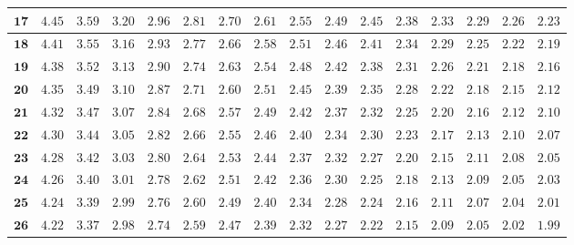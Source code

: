\begin{customTableWrapper}{1.4}
\begin{longtable}{|r|r|r|r|r|r|r|r|r|r|r|r|r|r|r|r|}
    ${\mathbf{17}}$  & ${4.45}$   & ${3.59}$   & ${3.20}$   & ${2.96}$   & ${2.81}$   & ${2.70}$   & ${2.61}$   & ${2.55}$   & ${2.49}$   & ${2.45}$   & ${2.38}$   & ${2.33}$   & ${2.29}$   & ${2.26}$   & ${2.23}$   \\ \hline
    ${\mathbf{18}}$  & ${4.41}$   & ${3.55}$   & ${3.16}$   & ${2.93}$   & ${2.77}$   & ${2.66}$   & ${2.58}$   & ${2.51}$   & ${2.46}$   & ${2.41}$   & ${2.34}$   & ${2.29}$   & ${2.25}$   & ${2.22}$   & ${2.19}$   \\ \hline
    ${\mathbf{19}}$  & ${4.38}$   & ${3.52}$   & ${3.13}$   & ${2.90}$   & ${2.74}$   & ${2.63}$   & ${2.54}$   & ${2.48}$   & ${2.42}$   & ${2.38}$   & ${2.31}$   & ${2.26}$   & ${2.21}$   & ${2.18}$   & ${2.16}$   \\ \hline
    ${\mathbf{20}}$  & ${4.35}$   & ${3.49}$   & ${3.10}$   & ${2.87}$   & ${2.71}$   & ${2.60}$   & ${2.51}$   & ${2.45}$   & ${2.39}$   & ${2.35}$   & ${2.28}$   & ${2.22}$   & ${2.18}$   & ${2.15}$   & ${2.12}$   \\ \hline
    ${\mathbf{21}}$  & ${4.32}$   & ${3.47}$   & ${3.07}$   & ${2.84}$   & ${2.68}$   & ${2.57}$   & ${2.49}$   & ${2.42}$   & ${2.37}$   & ${2.32}$   & ${2.25}$   & ${2.20}$   & ${2.16}$   & ${2.12}$   & ${2.10}$   \\ \hline
    ${\mathbf{22}}$  & ${4.30}$   & ${3.44}$   & ${3.05}$   & ${2.82}$   & ${2.66}$   & ${2.55}$   & ${2.46}$   & ${2.40}$   & ${2.34}$   & ${2.30}$   & ${2.23}$   & ${2.17}$   & ${2.13}$   & ${2.10}$   & ${2.07}$   \\ \hline
    ${\mathbf{23}}$  & ${4.28}$   & ${3.42}$   & ${3.03}$   & ${2.80}$   & ${2.64}$   & ${2.53}$   & ${2.44}$   & ${2.37}$   & ${2.32}$   & ${2.27}$   & ${2.20}$   & ${2.15}$   & ${2.11}$   & ${2.08}$   & ${2.05}$   \\ \hline
    ${\mathbf{24}}$  & ${4.26}$   & ${3.40}$   & ${3.01}$   & ${2.78}$   & ${2.62}$   & ${2.51}$   & ${2.42}$   & ${2.36}$   & ${2.30}$   & ${2.25}$   & ${2.18}$   & ${2.13}$   & ${2.09}$   & ${2.05}$   & ${2.03}$   \\ \hline
    ${\mathbf{25}}$  & ${4.24}$   & ${3.39}$   & ${2.99}$   & ${2.76}$   & ${2.60}$   & ${2.49}$   & ${2.40}$   & ${2.34}$   & ${2.28}$   & ${2.24}$   & ${2.16}$   & ${2.11}$   & ${2.07}$   & ${2.04}$   & ${2.01}$   \\ \hline
    ${\mathbf{26}}$  & ${4.22}$   & ${3.37}$   & ${2.98}$   & ${2.74}$   & ${2.59}$   & ${2.47}$   & ${2.39}$   & ${2.32}$   & ${2.27}$   & ${2.22}$   & ${2.15}$   & ${2.09}$   & ${2.05}$   & ${2.02}$   & ${1.99}$   \\ \hline

\end{longtable}
\end{customTableWrapper}

